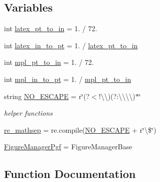 \subsection*{Variables}
\begin{DoxyCompactItemize}
\item 
int \hyperlink{namespacematplotlib_1_1backends_1_1backend__pgf_a4e669a5ac5765be07c1e34178c22061e}{latex\+\_\+pt\+\_\+to\+\_\+in} = 1. / 72.
\item 
int \hyperlink{namespacematplotlib_1_1backends_1_1backend__pgf_a92aecffec605300883cd6e5ede00db6a}{latex\+\_\+in\+\_\+to\+\_\+pt} = 1. / \hyperlink{namespacematplotlib_1_1backends_1_1backend__pgf_a4e669a5ac5765be07c1e34178c22061e}{latex\+\_\+pt\+\_\+to\+\_\+in}
\item 
int \hyperlink{namespacematplotlib_1_1backends_1_1backend__pgf_af1ad6ad40009fde1c3630fc0a1ae9859}{mpl\+\_\+pt\+\_\+to\+\_\+in} = 1. / 72.
\item 
int \hyperlink{namespacematplotlib_1_1backends_1_1backend__pgf_acbab79fa4bf69b81442b2b96e466ca02}{mpl\+\_\+in\+\_\+to\+\_\+pt} = 1. / \hyperlink{namespacematplotlib_1_1backends_1_1backend__pgf_af1ad6ad40009fde1c3630fc0a1ae9859}{mpl\+\_\+pt\+\_\+to\+\_\+in}
\item 
string \hyperlink{namespacematplotlib_1_1backends_1_1backend__pgf_abb2e838f30c4e549ed29fc93e3901531}{N\+O\+\_\+\+E\+S\+C\+A\+PE} = r\char`\"{}(?$<$!\textbackslash{}\textbackslash{})(?\+:\textbackslash{}\textbackslash{}\textbackslash{}\textbackslash{})$\ast$\char`\"{}
\begin{DoxyCompactList}\small\item\em helper functions \end{DoxyCompactList}\item 
\hyperlink{namespacematplotlib_1_1backends_1_1backend__pgf_a4509680a429f500fd636f971fcd8ed1f}{re\+\_\+mathsep} = re.\+compile(\hyperlink{namespacematplotlib_1_1backends_1_1backend__pgf_abb2e838f30c4e549ed29fc93e3901531}{N\+O\+\_\+\+E\+S\+C\+A\+PE} + r\char`\"{}\textbackslash{}\$\char`\"{})
\item 
\hyperlink{namespacematplotlib_1_1backends_1_1backend__pgf_aa8bb54bf6c7f079c4499849ec2248693}{Figure\+Manager\+Pgf} = Figure\+Manager\+Base
\end{DoxyCompactItemize}


\subsection{Function Documentation}
\mbox{\label{namespacematplotlib_1_1backends_1_1backend__pgf_aaff36e5d5138ce325d6a1324bb27bf51}} 
